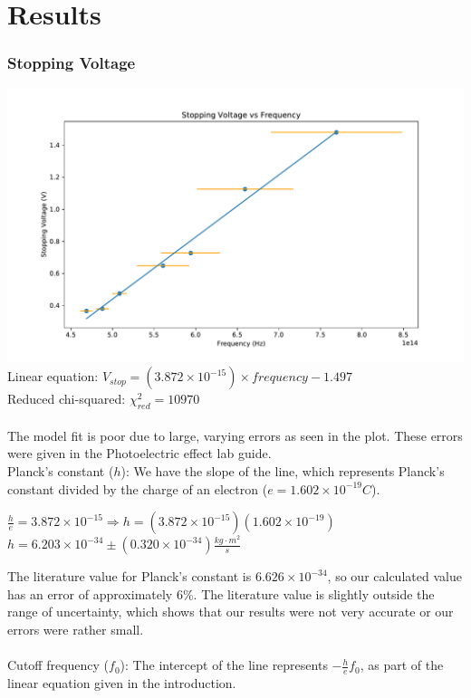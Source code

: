 \documentclass[a4paper, 11pt]{article}
\begin{document}
\section*{Results}

\subsubsection*{Stopping Voltage}

\includegraphics[width=\textwidth]{vstop_freq.pdf}
Linear equation: $V_{stop} = (3.872 \times 10^{-15}) \times frequency - 1.497$ \\
Reduced chi-squared: $\chi^{2}_{red} = 10970$ \\
\\
The model fit is poor due to large, varying errors as seen in the plot. These errors were given in the Photoelectric effect lab guide.
\\
Planck's constant ($h$): We have the slope of the line, which represents Planck's constant divided by the charge of an electron ($e = 1.602 \times 10^{-19} C$).
\begin{center}
$\frac{h}{e} = 3.872 \times 10^{-15} \Rightarrow h = (3.872 \times 10^{-15})(1.602 \times 10^{-19})$ 
\\
$h = 6.203 \times 10^{-34} \pm (0.320 \times 10^{-34}) \frac{kg \cdot m^2}{s}$
\end{center}
The literature value for Planck's constant is $6.626 \times 10^{-34}$, so our calculated value has an error of approximately 6\%. The literature value is slightly outside the range of uncertainty, which shows that our results were not very accurate or our errors were rather small.\\
\\
Cutoff frequency ($f_0$): The intercept of the line represents $-\frac{h}{e}f_0$, as part of the linear equation given in the introduction.
\end{document}
